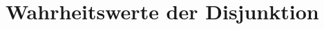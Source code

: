 \documentclass[main.tex]{subfiles}
\begin{document}
\FormulaThmAuto{\bot\land \top \eqvdash \bot}
\begin{tabproofsplit}
  \proofpart{$\vdash$}
  \closeproofpart

  \proofpart{$\dashv$}
    \proofstep{}{\top}{\FormulaRefAuto{\top}}
  \closeproofpart
\end{tabproofsplit}

\FormulaThmAuto{\bot\land \bot \eqvdash \bot}
\begin{tabproofsplit}
  \proofpart{$\vdash$}
  \closeproofpart

  \proofpart{$\dashv$}
  \closeproofpart
\end{tabproofsplit}

\section{Wahrheitswerte der Disjunktion}

\FormulaThmAuto{\top\lor \top \eqvdash \top}
\begin{tabproofsplit}
  \proofpart{$\vdash$}
  \closeproofpart

  \proofpart{$\dashv$}
  \closeproofpart
\end{tabproofsplit}

\FormulaThmAuto{\top\lor \bot \eqvdash \top}
\begin{tabproofsplit}
  \proofpart{$\vdash$}
    \proofstep{}{\top}{\FormulaRefAuto{\top}}
  \closeproofpart

  \proofpart{$\dashv$}
  \closeproofpart
\end{tabproofsplit}

\FormulaThmAuto{\bot\lor \top \eqvdash \top}
\begin{tabproofsplit}
  \proofpart{$\vdash$}
    \proofstep{}{\top}{\FormulaRefAuto{\top}}
  \closeproofpart

  \proofpart{$\dashv$}
  \closeproofpart
\end{tabproofsplit}
\end{document}
